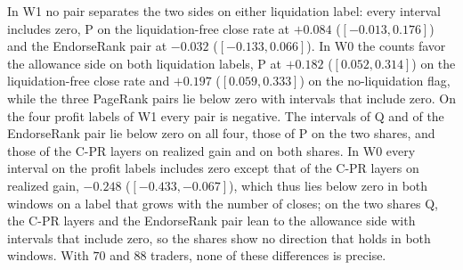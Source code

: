 

In W1 no pair separates the two sides on either liquidation label: every interval includes zero, P on the liquidation-free close rate at $+0.084$ ($[-0.013,0.176]$) and the EndorseRank pair at $-0.032$ ($[-0.133,0.066]$). In W0 the counts favor the allowance side on both liquidation labels, P at $+0.182$ ($[0.052,0.314]$) on the liquidation-free close rate and $+0.197$ ($[0.059,0.333]$) on the no-liquidation flag, while the three PageRank pairs lie below zero with intervals that include zero. On the four profit labels of W1 every pair is negative. The intervals of Q and of the EndorseRank pair lie below zero on all four, those of P on the two shares, and those of the C-PR layers on realized gain and on both shares. In W0 every interval on the profit labels includes zero except that of the C-PR layers on realized gain, $-0.248$ ($[-0.433,-0.067]$), which thus lies below zero in both windows on a label that grows with the number of closes; on the two shares Q, the C-PR layers and the EndorseRank pair lean to the allowance side with intervals that include zero, so the shares show no direction that holds in both windows. With $70$ and $88$ traders, none of these differences is precise.
